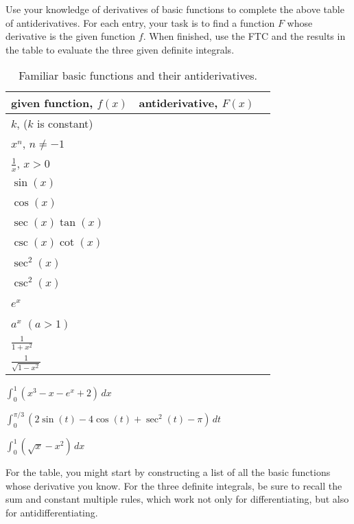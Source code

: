 \begin{activity} \label{A:4.4.2}  Use your knowledge of derivatives of basic functions to complete the above table of antiderivatives.  For each entry, your task is to find a function $F$ whose derivative is the given function $f$.  When finished, use the FTC and the results in the table to evaluate the three given definite integrals.
\begin{table}
\begin{center}
\begin{tabular}{ | l || l | }
   \hline 
\T given function, $f(x)$ \hspace{1.25in} &  antiderivative, $F(x)$  \hspace{1.15in} \ \B \\
\hline \hline
\T $k$, ($k$ is constant) & \ \B \\
\hline
\T $x^n$, $n \ne -1$ & \  \B \\
\hline 
\T $\frac{1}{x}$, $x > 0$ & \ \B \\ 
\hline
\T $\sin(x)$ & \ \B \\
\hline
\T $\cos(x)$ & \ \B \\
\hline
\T $\sec(x) \tan(x)$ & \ \B \\
\hline
\T $\csc(x) \cot(x)$ & \ \B \\
\hline
\T $\sec^2 (x)$ & \ \B \\
\hline
\T $\csc^2 (x)$ & \ \B \\
\hline
\T $e^x$  & \ \B \\
\hline
\T $a^x$ $(a > 1)$  & \ \B \\
\hline
\T $\frac{1}{1+x^2}$ & \ \B \\
\hline
\T $\frac{1}{\sqrt{1-x^2}}$ & \ \B \\
\hline
\end{tabular} 
\end{center}
\caption{Familiar basic functions and their antiderivatives.} 
\label{T:4.4.Act2}
\end{table}

\ba
      \item  $\displaystyle \int_0^1 \left(x^3 - x - e^x + 2\right) \,dx$
	\item  $\displaystyle \int_0^{\pi/3} (2\sin (t) - 4\cos(t) + \sec^2(t) - \pi) \, dt$
	\item  $\displaystyle \int_0^1 (\sqrt{x}-x^2) \, dx$
\ea
\end{activity}
\begin{smallhint}
For the table, you might start by constructing a list of all the basic functions whose derivative you know.  For the three definite integrals, be sure to recall the sum and constant multiple rules, which work not only for differentiating, but also for antidifferentiating.
\end{smallhint}
